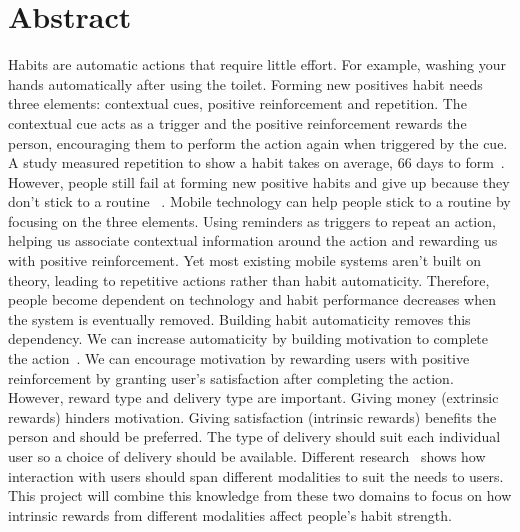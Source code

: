 \section*{Abstract}
Habits are automatic actions that require little effort. For example, washing your hands automatically after using the toilet. Forming new positives habit needs three elements: contextual cues, positive reinforcement and repetition. The contextual cue acts as a trigger and the positive reinforcement rewards the person, encouraging them to perform the action again when triggered by the cue. A study measured repetition to show a habit takes on average, 66 days to form~\cite{article_how_habits_formed_modelling_habit_formation}. However, people still fail at forming new positive habits and give up because they don't stick to a routine ~\cite{article_promoting_habit_formation, article_the_habitual_consumer}.\newline
\newline
Mobile technology can help people stick to a routine by focusing on the three elements. Using reminders as triggers to repeat an action, helping us associate contextual information around the action and rewarding us with positive reinforcement. Yet most existing mobile systems aren't built on theory, leading to repetitive actions rather than habit automaticity. Therefore, people become dependent on technology and habit performance decreases when the system is eventually removed.\newline
\newline
Building habit automaticity removes this dependency. We can increase automaticity by building motivation to complete the action~\cite{article_a_self_efficacy, article_meta_analytic_review_intrinsic_motivation}. We can encourage motivation by rewarding users with positive reinforcement by granting user's satisfaction after completing the action. However, reward type and delivery type are important. Giving money (extrinsic rewards) hinders motivation. Giving satisfaction (intrinsic rewards) benefits the person and should be preferred. The type of delivery should suit each individual user so a choice of delivery should be available. Different research~\cite{article_user_centred_multimodal_reminders} shows how interaction with users should span different modalities to suit the needs to users. This project will combine this knowledge from these two domains to focus on how intrinsic rewards from different modalities affect people's habit strength.\newline
\newline
